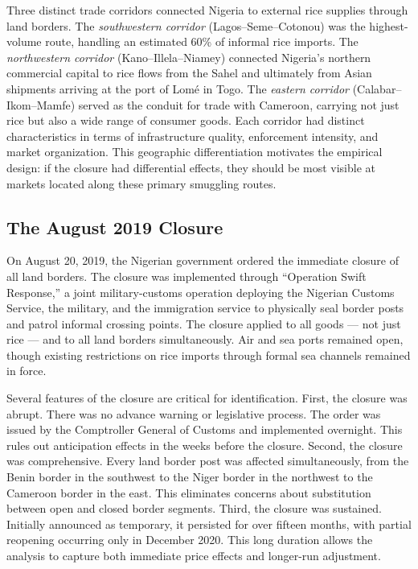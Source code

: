 \documentclass[12pt]{article}
\begin{document}
Three distinct trade corridors connected Nigeria to external rice supplies through land borders. The \emph{southwestern corridor} (Lagos--Seme--Cotonou) was the highest-volume route, handling an estimated 60\% of informal rice imports. The \emph{northwestern corridor} (Kano--Illela--Niamey) connected Nigeria's northern commercial capital to rice flows from the Sahel and ultimately from Asian shipments arriving at the port of Lomé in Togo. The \emph{eastern corridor} (Calabar--Ikom--Mamfe) served as the conduit for trade with Cameroon, carrying not just rice but also a wide range of consumer goods. Each corridor had distinct characteristics in terms of infrastructure quality, enforcement intensity, and market organization. This geographic differentiation motivates the empirical design: if the closure had differential effects, they should be most visible at markets located along these primary smuggling routes.

\subsection{The August 2019 Closure}

On August 20, 2019, the Nigerian government ordered the immediate closure of all land borders. The closure was implemented through ``Operation Swift Response,'' a joint military-customs operation deploying the Nigerian Customs Service, the military, and the immigration service to physically seal border posts and patrol informal crossing points. The closure applied to all goods --- not just rice --- and to all land borders simultaneously. Air and sea ports remained open, though existing restrictions on rice imports through formal sea channels remained in force.

Several features of the closure are critical for identification. First, the closure was abrupt. There was no advance warning or legislative process. The order was issued by the Comptroller General of Customs and implemented overnight. This rules out anticipation effects in the weeks before the closure. Second, the closure was comprehensive. Every land border post was affected simultaneously, from the Benin border in the southwest to the Niger border in the northwest to the Cameroon border in the east. This eliminates concerns about substitution between open and closed border segments. Third, the closure was sustained. Initially announced as temporary, it persisted for over fifteen months, with partial reopening occurring only in December 2020. This long duration allows the analysis to capture both immediate price effects and longer-run adjustment.
\end{document}
